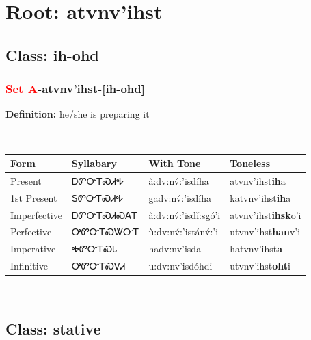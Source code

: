 \needspace{4in}
\section*{Root: atvnv'ihst}
\nopagebreak
{}
\needspace{3in}
\subsection*{Class: ih-ohd}
\nopagebreak
\needspace{2in}
\subsubsection*{\textcolor{Red}{Set A}{-}\textbf{atvnv'ihst}{-}[ih-ohd]}
\nopagebreak
\textbf{Definition: } he/she is preparing it
\\[0.5em]
\begin{tabularx}{\textwidth}{l X X X}%
\toprule%
\textbf{Form}&\textbf{Syllabary}&\textbf{With Tone}&\textbf{Toneless}\\%
\midrule%
Present&ᎠᏛᏅᎢᏍᏗᎭ&à:dv:nv́:’isdíha&atvnv'ihst\textbf{ih}a\\%
1st Present&ᎦᏛᏅᎢᏍᏗᎭ&gadv:nv́:’isdíha&katvnv'ihst\textbf{ih}a\\%
Imperfective&ᎠᏛᏅᎢᏍᏗᏍᎪᎢ&à:dv:nv́:’isdǐ:sgó’i&atvnv'ihst\textbf{ihsk}o'i\\%
Perfective&ᎤᏛᏅᎢᏍᏔᏅᎢ&ù:dv:nv́:’istánv́:’i&utvnv'ihst\textbf{han}v'i\\%
Imperative&ᎭᏛᏅᎢᏍᏓ&hadv:nv’isda&hatvnv'ihst\textbf{a}\\%
Infinitive&ᎤᏛᏅᎢᏍᏙᏗ&u:dv:nv’isdóhdi&utvnv'ihst\textbf{oht}i\\%
\bottomrule%
\end{tabularx}
\\[1em]
\needspace{3in}
\subsection*{Class: stative}
\nopagebreak
\needspace{2in}
